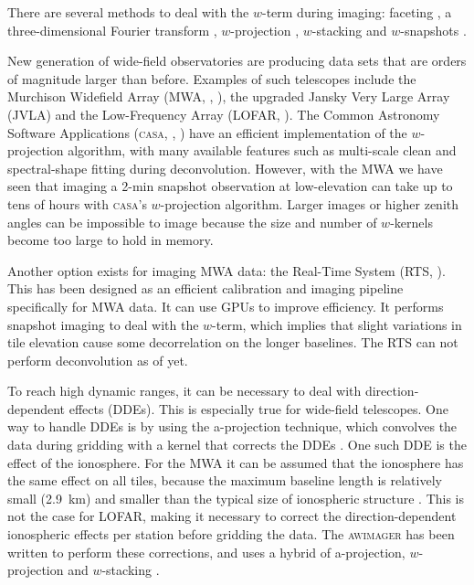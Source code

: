 \documentclass[useAMS,usenatbib]{mn2e}
\begin{document}
There are several methods to deal with the $w$-term during imaging: faceting \citep{facetting-cornwell}, a three-dimensional Fourier transform \citep{perley-noncoplanar-arrays}, $w$-projection \citep{wprojection-cornwell}, $w$-stacking \citep{ska-memo-regridding-2011} and $w$-snapshots \citep{widefield-imaging-ska-cornwell}.

New generation of wide-field observatories are producing data sets that are orders of magnitude larger than before. Examples of such telescopes include the Murchison Widefield Array (MWA, \citealt{mwa-design-2009}, \citealt{mwa}), the upgraded Jansky Very Large Array (JVLA) and the Low-Frequency Array (LOFAR, \citealt{lofar-2013}). The Common Astronomy Software Applications (\textsc{casa}, \citealt{casa-2007}, \citealt{casa-2008}) have an efficient implementation of the $w$-projection algorithm, with many available features such as multi-scale clean and spectral-shape fitting during deconvolution. However, with the MWA we have seen that imaging a 2-min snapshot observation at low-elevation can take up to tens of hours with \textsc{casa}'s $w$-projection algorithm. Larger images or higher zenith angles can be impossible to image because the size and number of $w$-kernels become too large to hold in memory.

Another option exists for imaging MWA data: the Real-Time System (RTS, \citealt{rts-mwa,mwa-interferometric-imaging}). This has been designed as an efficient calibration and imaging pipeline specifically for MWA data. It can use GPUs to improve efficiency. It performs snapshot imaging to deal with the $w$-term, which implies that slight variations in tile elevation cause some decorrelation on the longer baselines. The RTS can not perform deconvolution as of yet.

To reach high dynamic ranges, it can be necessary to deal with direction-dependent effects (DDEs). This is especially true for wide-field telescopes. One way to handle DDEs is by using the a-projection technique, which convolves the data during gridding with a kernel that corrects the DDEs \citep{aprojection-2008}.
One such DDE is the effect of the ionosphere. For the MWA it can be assumed that the ionosphere has the same effect on all tiles, because the maximum baseline length is relatively small (2.9~km) and smaller than the typical size of ionospheric structure \citep{lonsdale-calibration-approaches-ionosphere}. This is not the case for LOFAR, making it necessary to correct the direction-dependent ionospheric effects per station before gridding the data. The \textsc{awimager} has been written to perform these corrections, and uses a hybrid of a-projection, $w$-projection and $w$-stacking \citep{awimager-2013}.
\end{document}
